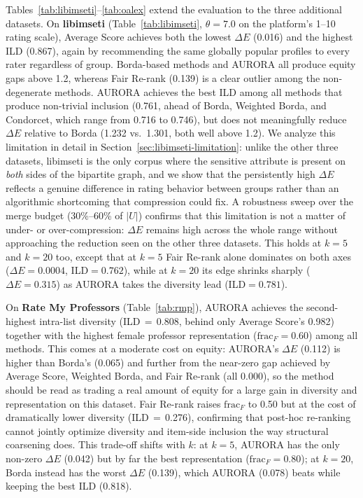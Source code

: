 \documentclass[runningheads]{llncs}
\begin{document}
Tables~\ref{tab:libimseti}--\ref{tab:oalex} extend the evaluation to the
three additional datasets. On \textbf{libimseti} (Table~\ref{tab:libimseti},
$\theta=7.0$ on the platform's 1--10 rating scale), Average Score achieves
both the lowest $\Delta E$ (0.016) and the highest ILD (0.867), again by
recommending the same globally popular profiles to every rater regardless of
group. Borda-based methods and AURORA all produce equity gaps above 1.2,
whereas Fair Re-rank (0.139) is a clear outlier among the non-degenerate
methods. AURORA achieves the best ILD among all methods that produce
non-trivial inclusion (0.761, ahead of Borda, Weighted Borda, and Condorcet,
which range from 0.716 to 0.746), but does not meaningfully reduce $\Delta E$
relative to Borda (1.232 vs.\ 1.301, both well above 1.2).
We analyze this limitation in detail in
Section~\ref{sec:libimseti-limitation}: unlike the other three
datasets, libimseti is the only corpus where the sensitive attribute is
present on \emph{both} sides of the bipartite graph, and we show that the
persistently high $\Delta E$ reflects a genuine difference in rating
behavior between groups rather than an algorithmic shortcoming that
compression could fix. A robustness sweep over the merge budget (30\%--60\%
of $|U|$) confirms that this limitation is not a matter of under- or
over-compression: $\Delta E$ remains high across the whole range without
approaching the reduction seen on the other three datasets. This holds at
$k=5$ and $k=20$ too, except that at $k=5$ Fair Re-rank alone dominates
on both axes ($\Delta E=0.0004$, ILD$=0.762$), while at $k=20$ its edge
shrinks sharply ($\Delta E=0.315$) as AURORA takes the diversity lead
(ILD$=0.781$).

On \textbf{Rate My Professors} (Table~\ref{tab:rmp}), AURORA achieves the
second-highest intra-list diversity (ILD\,$=$\,0.808, behind only Average
Score's 0.982) together with the highest female professor representation
($\mathrm{frac}_F = 0.60$) among all methods. This comes at a moderate cost
on equity: AURORA's $\Delta E$ (0.112) is higher than Borda's (0.065) and
further from the near-zero gap achieved by Average Score, Weighted Borda,
and Fair Re-rank (all 0.000), so the method should be read as trading a
real amount of equity for a large gain in diversity and representation on
this dataset. Fair Re-rank raises $\mathrm{frac}_F$ to 0.50 but at the
cost of dramatically lower diversity (ILD\,$=$\,0.276), confirming that
post-hoc re-ranking cannot jointly optimize diversity and item-side
inclusion the way structural coarsening does. This trade-off shifts with
$k$: at $k=5$, AURORA has the only non-zero $\Delta E$ (0.042) but by
far the best representation ($\mathrm{frac}_F=0.80$); at $k=20$, Borda
instead has the worst $\Delta E$ (0.139), which AURORA (0.078) beats
while keeping the best ILD (0.818).
\end{document}

